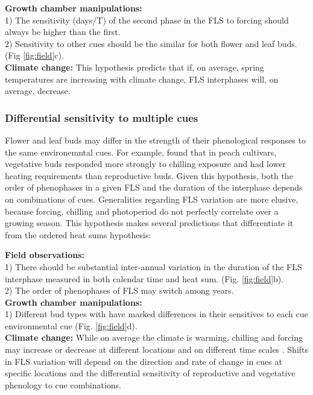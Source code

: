 \documentclass[11pt]{article}
\begin{document}
\noindent \textbf{Growth chamber manipulations:}
\\1) The sensitivity (\delta days/\delta T) of the second phase in the FLS to forcing should always be higher than the first.\\ 2) Sensitivity to other cues should be the similar for both flower and leaf buds. (Fig \ref{fig:field}c).\\

\noindent \textbf{Climate change:} This hypothesis predicts that if, on average, spring temperatures are increasing with climate change, FLS interphases will, on average, decrease.\\

\subsubsection*{Differential sensitivity to multiple cues}
 \noindent Flower and leaf buds may differ in the strength of their phenological responses to the same environemntal cues. For example, \citet{Garigalio2016} found that in peach cultivars, vegetative buds responded more strongly to chilling exposure and had lower heating requirements than reproductive buds. Given this hypothesis, both the order of phenophases in a given FLS and the duration of the interphase depends on combinations of cues. Generalities regarding FLS variation are more elusive, because forcing, chilling and photoperiod do not perfectly correlate over a growing season. This hypothesis makes several predictions that differentiate it from the ordered heat sums hypothesis:

\noindent \textbf{Field observations:}\\ 1)  There should be substantial inter-annual variation in the duration of the FLS interphase measured in both calendar time and heat sum. (Fig. \ref{fig:field}b).\\ 2) The order of phenophases of FLS may switch among years.\\

\noindent \textbf{Growth chamber manipulations:}\\ 1) Different bud types with have marked differences in their sensitives to each cue environmental cue (Fig. \ref{fig:field}d).\\

\noindent \textbf{Climate change:} While on average the climate is warming, chilling and forcing may increase or decrease at different locations and on different time scales \citep{Ettinger}. Shifts in FLS variation will depend on the direction and rate of change in cues at specific locations and the differential sensitivity of reproductive and vegetative phenology to cue combinations.\\
\end{document}
